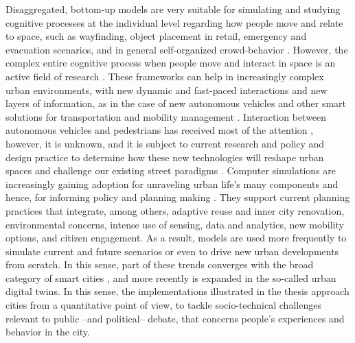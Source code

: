 Disaggregated, bottom-up models are very suitable for simulating and studying cognitive processes at the individual level regarding how people move and relate to space, such as wayfinding, object placement in retail, emergency and evacuation scenarios, and in general self-organized crowd-behavior \citep{Timmermans2009}. However, the complex entire cognitive process when people move and interact in space is an active field of research \citep{Dubey2018TowardsEnv,Dubey2019FusionSources}. These frameworks can help in increasingly complex urban environments, with new dynamic and fast-paced interactions and new layers of information, as in the case of new autonomous vehicles and other smart solutions for transportation and mobility management \citep{Duarte2018,Dubey2024AdapLanes,Dubey2024Fairlane}. Interaction between autonomous vehicles and pedestrians has received most of the attention \citep{Jayaraman2019}, however, it is unknown, and it is subject to current research and policy and design practice to determine how these new technologies will reshape urban spaces and challenge our existing street paradigms \citep{ Meyboom2018,Riggs2020}.    
Computer simulations are increasingly gaining adoption for unraveling urban life's many components and hence, for informing policy and planning making \citep{Batty2005Agents}. They support current planning practices that integrate, among others, adaptive reuse and inner city renovation, environmental concerns, intense use of sensing, data and analytics, new mobility options, and citizen engagement. As a result, models are used more frequently to simulate current and future scenarios \citep{Guzman2014,Wang2015, Batty2020} or even to drive new urban developments from scratch. In this sense, part of these trends converges with the broad category of smart cities \citep{Batty2020smartcities}, and more recently is expanded in the so-called urban digital twins.
In this sense, the implementations illustrated in the thesis approach cities from a quantitative point of view, to tackle socio-technical challenges relevant to public --and political-- debate, that concerns people's experiences and behavior in the city. 



